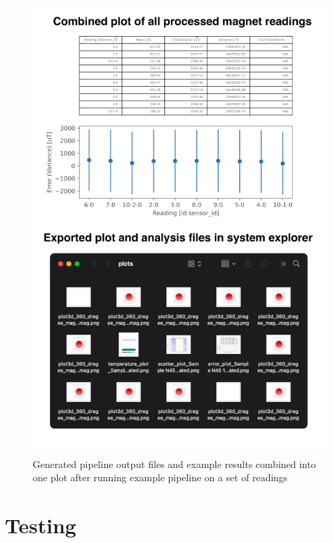 \begin{figure}
\centering
\includegraphics{./generated_images/border_Generated_pipeline_output_files_and example_results_combined_into_one_plot_after_running_example_pipeline_on_a_set_of_readings.png}
\caption{Generated pipeline output files and example results combined
into one plot after running example pipeline on a set of readings
\label{Generated_pipeline_output_files_and example_results_combined_into_one_plot_after_running_example_pipeline_on_a_set_of_readings.png}}
\end{figure}

\hypertarget{testing}{%
\section{Testing}\label{testing}}

